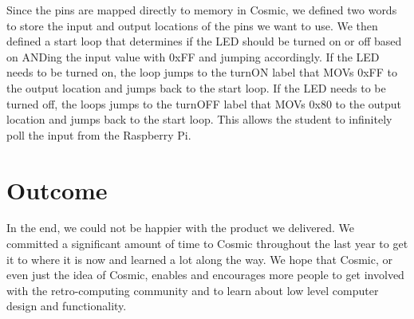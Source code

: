 \documentclass[conference]{IEEEtran}
\begin{document}
Since the pins are mapped directly to memory in Cosmic, we defined two words to store the input and output locations of the pins we want to use. We then defined a start loop that determines if the LED should be turned on or off based on ANDing the input value with 0xFF and jumping accordingly. If the LED needs to be turned on, the loop jumps to the turnON label that MOVs 0xFF to the output location and jumps back to the start loop. If the LED needs to be turned off, the loops jumps to the turnOFF label that MOVs 0x80 to the output location and jumps back to the start loop. This allows the student to infinitely poll the input from the Raspberry Pi.

\section{Outcome}
In the end, we could not be happier with the product we delivered. We committed a significant amount of time to Cosmic throughout the last year to get it to where it is now and learned a lot along the way. We hope that Cosmic, or even just the idea of Cosmic, enables and encourages more people to get involved with the retro-computing community and to learn about low level computer design and functionality.
\end{document}
